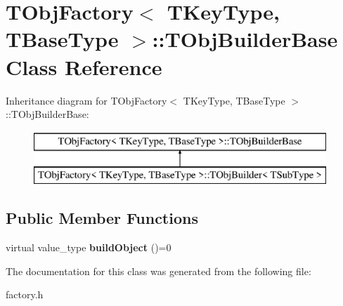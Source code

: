 \hypertarget{class_t_obj_factory_1_1_t_obj_builder_base}{\section{T\+Obj\+Factory$<$ T\+Key\+Type, T\+Base\+Type $>$\+:\+:T\+Obj\+Builder\+Base Class Reference}
\label{class_t_obj_factory_1_1_t_obj_builder_base}
}
Inheritance diagram for T\+Obj\+Factory$<$ T\+Key\+Type, T\+Base\+Type $>$\+:\+:T\+Obj\+Builder\+Base\+:\begin{figure}[H]
\begin{center}
\leavevmode
\includegraphics[height=2.000000cm]{class_t_obj_factory_1_1_t_obj_builder_base}
\end{center}
\end{figure}
\subsection*{Public Member Functions}
\begin{DoxyCompactItemize}
\item 
\hypertarget{class_t_obj_factory_1_1_t_obj_builder_base_a6175430ca7c2a8397476adef48aa2fd1}{virtual value\+\_\+type {\bfseries build\+Object} ()=0}\label{class_t_obj_factory_1_1_t_obj_builder_base_a6175430ca7c2a8397476adef48aa2fd1}

\end{DoxyCompactItemize}


The documentation for this class was generated from the following file\+:\begin{DoxyCompactItemize}
\item 
factory.\+h\end{DoxyCompactItemize}
